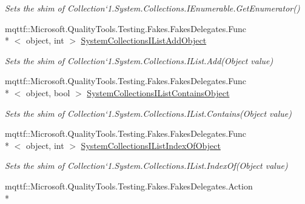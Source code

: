 \begin{DoxyCompactItemize}
\begin{DoxyCompactList}\small\item\em Sets the shim of Collection`1.System.\-Collections.\-I\-Enumerable.\-Get\-Enumerator()\end{DoxyCompactList}\item 
mqttf\-::\-Microsoft.\-Quality\-Tools.\-Testing.\-Fakes.\-Fakes\-Delegates.\-Func\\*
$<$ object, int $>$ \hyperlink{class_system_1_1_collections_1_1_object_model_1_1_fakes_1_1_shim_collection_3_01_t_01_4_ae5099b55c277cee7bdfc14d3b158cc4e}{System\-Collections\-I\-List\-Add\-Object}
\begin{DoxyCompactList}\small\item\em Sets the shim of Collection`1.System.\-Collections.\-I\-List.\-Add(\-Object value)\end{DoxyCompactList}\item 
mqttf\-::\-Microsoft.\-Quality\-Tools.\-Testing.\-Fakes.\-Fakes\-Delegates.\-Func\\*
$<$ object, bool $>$ \hyperlink{class_system_1_1_collections_1_1_object_model_1_1_fakes_1_1_shim_collection_3_01_t_01_4_ab8ff36a2ca56e793042bba819a4d646c}{System\-Collections\-I\-List\-Contains\-Object}
\begin{DoxyCompactList}\small\item\em Sets the shim of Collection`1.System.\-Collections.\-I\-List.\-Contains(\-Object value)\end{DoxyCompactList}\item 
mqttf\-::\-Microsoft.\-Quality\-Tools.\-Testing.\-Fakes.\-Fakes\-Delegates.\-Func\\*
$<$ object, int $>$ \hyperlink{class_system_1_1_collections_1_1_object_model_1_1_fakes_1_1_shim_collection_3_01_t_01_4_a015dbdc4ae8ea7ba1f52e70b3c4b0bb4}{System\-Collections\-I\-List\-Index\-Of\-Object}
\begin{DoxyCompactList}\small\item\em Sets the shim of Collection`1.System.\-Collections.\-I\-List.\-Index\-Of(\-Object value)\end{DoxyCompactList}\item 
mqttf\-::\-Microsoft.\-Quality\-Tools.\-Testing.\-Fakes.\-Fakes\-Delegates.\-Action\\*

\end{DoxyCompactItemize}
